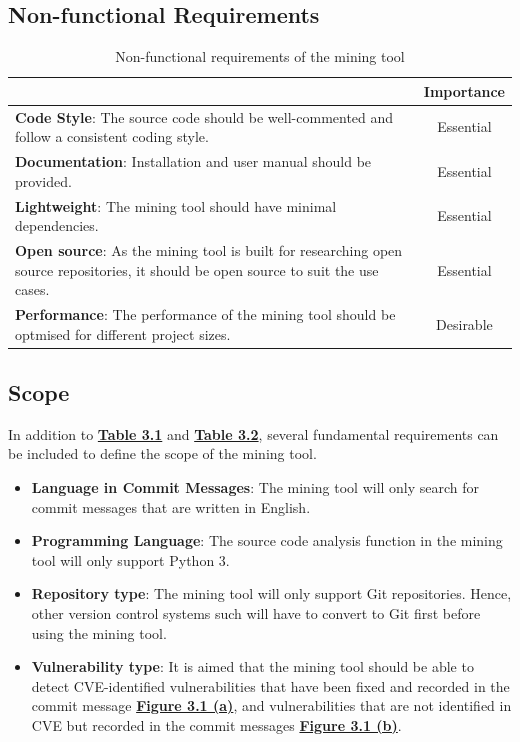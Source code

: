 \documentclass[12pt, a4paper]{report}
\begin{document}
\subsection{Non-functional Requirements}
\begin{table}[H]
	\begin{center}
		\begin{tabular}{|p{10.3cm}|c|}
			\hline
			\rowcolor[HTML]{D8D8D8}
			\multicolumn{1}{|c|}{Criteria} & Importance \\ \hline
			\textbf{Code Style}: The source code should be well-commented and follow a consistent coding
      style. & Essential \\ \hline
      \textbf{Documentation}: Installation and user manual should be provided. & Essential \\ \hline
      \textbf{Lightweight}: The mining tool should have minimal dependencies. & Essential \\ \hline
      \textbf{Open source}: As the mining tool is built for researching open source repositories, it
      should be open source to suit the use cases. & Essential \\
      \textbf{Performance}: The performance of the mining tool should be optmised for different
      project sizes. & Desirable \\
      \hline
			\end{tabular}
		\caption{Non-functional requirements of the mining tool} \label{table:nonfunc_req}
	\end{center}
\end{table}

\subsection{Scope}
In addition to \hyperref[table:func_req]{\textbf{Table 3.1}} and
\hyperref[table:nonfunc_req]{\textbf{Table 3.2}}, several fundamental requirements can be included
to define the scope of the mining tool.

\begin{itemize}
	\item \textbf{Language in Commit Messages}: The mining tool will only search for commit messages
	that are written in English.
	\item \textbf{Programming Language}: The source code analysis function in the mining tool will
	only support Python 3.
	\item \textbf{Repository type}: The mining tool will only support Git repositories. Hence, other
	version control systems such will have to convert to Git first before using the mining tool.
	\item \textbf{Vulnerability type}: It is aimed that the mining tool should be able to detect
	CVE-identified vulnerabilities that have been fixed and recorded in the commit message
	\hyperref[figure:cve_vuln]{\textbf{Figure 3.1 (a)}}, and vulnerabilities that are not identified
	in CVE but recorded in the commit messages \hyperref[figure:common_vuln]{\textbf{Figure 3.1 (b)}}.
\end{itemize}
\end{document}
